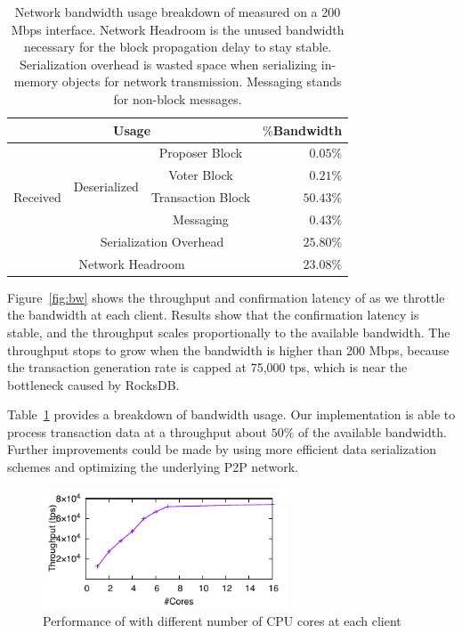 \begin{table}[ht]
\centering
\caption{\small Network bandwidth usage breakdown of \prism measured on a 200 Mbps interface. Network Headroom is the unused bandwidth necessary for the block propagation delay to stay stable. Serialization overhead is wasted space when serializing in-memory objects for network transmission. Messaging stands for non-block messages.}
\begin{tabular}{| c | c | c || r |} 
 \hline
 \multicolumn{3}{|c||}{Usage} & $\%$Bandwidth \\ [0.5ex] 
 \hline\hline
 \multirow{5}{*}{Received} & \multirow{4}{*}{Deserialized} & Proposer Block & $0.05\%$ \\
 && Voter Block & $0.21\%$ \\
 && Transaction Block & $50.43\%$ \\ \cline{3-4}
 && Messaging &  $0.43\%$ \\ \cline{2-4} 
 & \multicolumn{2}{|c||}{Serialization Overhead} & $25.80\%$ \\ \hline
 \multicolumn{3}{|c||}{Network Headroom} & $23.08\%$ \\
 \hline
\end{tabular}

\label{table:bw-profiling}
\end{table}

 Figure~\ref{fig:bw} shows the throughput and confirmation latency of \prism as we throttle the bandwidth at each client. Results show that the confirmation latency is stable, and the throughput scales proportionally to the available bandwidth. The throughput stops to grow when the bandwidth is higher than 200 Mbps, because the transaction generation rate is capped at 75,000 tps, which is near the bottleneck caused by RocksDB.

Table~\ref{table:bw-profiling} provides a breakdown of bandwidth usage. Our implementation is able to process transaction data at a throughput about $50\%$ of the available bandwidth. Further improvements could be made by using more efficient data serialization schemes and optimizing the underlying P2P network.

\begin{figure}
    \centering
    \includegraphics[width=0.65\textwidth]{figures/resource-fig-cpu.pdf}
\caption{\small Performance of \prism with different number of CPU cores at each client}
    \label{fig:cpu}
\end{figure}

